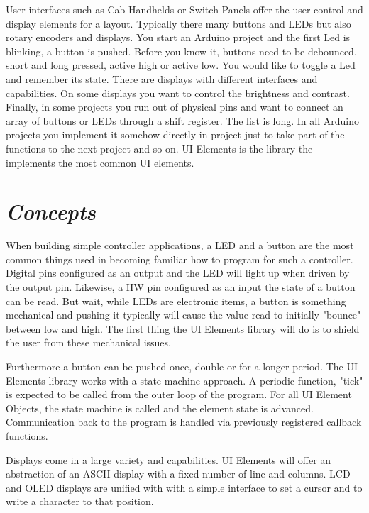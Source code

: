 
User interfaces such as Cab Handhelds or Switch Panels offer the user control and display elements for a layout. Typically there many buttons and LEDs but also rotary encoders and displays. You start an Arduino project and the first Led is blinking, a button is pushed. Before you know it, buttons need to be debounced, short and long pressed, active high or active low. You would like to toggle a Led and remember its state. There are displays with different interfaces and capabilities. On some displays you want to control the brightness and contrast. Finally, in some projects you run out of physical pins and want to connect an array of buttons or LEDs through a shift register. The list is long. In all Arduino projects you implement it somehow directly in project just to take part of the functions to the next project and so on. UI Elements is the library the implements the most common UI elements.

\section{\textit{Concepts}}

When building simple controller applications, a LED and a button are the most common things used in becoming familiar how to program for such a controller. Digital pins configured as an output and the LED will light up when driven by the output pin. Likewise, a HW pin configured as an input the state of a button can be read. But wait, while LEDs are electronic items, a button is something mechanical and pushing it typically will cause the value read to initially "bounce" between low and high. The first thing the UI Elements library will do is to shield the user from these mechanical issues.

Furthermore a button can be pushed once, double or for a longer period. The UI Elements library works with a state machine approach. A periodic function, "tick" is expected to be called from the outer loop of the program. For all UI Element Objects, the state machine is called and the element state is advanced. Communication back to the program is handled via previously registered callback functions.

Displays come in a large variety and capabilities. UI Elements will offer an abstraction of an ASCII display with a fixed number of line and columns. LCD and OLED displays are unified with with a simple interface to set a cursor and to write a character to that position.

